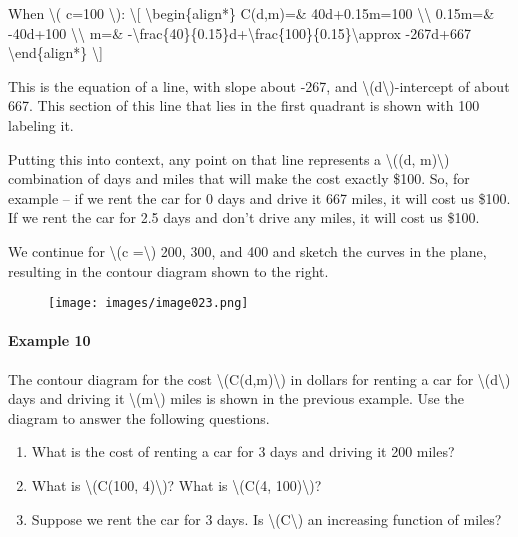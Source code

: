 When \textbackslash{}( c=100 \textbackslash{}): \textbackslash{}{[}
\textbackslash{}begin\{align*\} C(d,m)=\& 40d+0.15m=100
\textbackslash{}\textbackslash{} 0.15m=\& -40d+100
\textbackslash{}\textbackslash{} m=\&
-\textbackslash{}frac\{40\}\{0.15\}d+\textbackslash{}frac\{100\}\{0.15\}\textbackslash{}approx
-267d+667 \textbackslash{}end\{align*\} \textbackslash{}{]}

This is the equation of a line, with slope about -267, and
\textbackslash{}(d\textbackslash{})-intercept of about 667. This section
of this line that lies in the first quadrant is shown with 100 labeling
it.

Putting this into context, any point on that line represents a
\textbackslash{}((d, m)\textbackslash{}) combination of days and miles
that will make the cost exactly \$100. So, for example -- if we rent the
car for 0 days and drive it 667 miles, it will cost us \$100. If we rent
the car for 2.5 days and don't drive any miles, it will cost us \$100.

We continue for \textbackslash{}(c =\textbackslash{}) 200, 300, and 400
and sketch the curves in the plane, resulting in the contour diagram
shown to the right.

\begin{figure}
\centering
\texttt{[image: images/image023.png]}
\caption{}
\end{figure}

\hypertarget{example-10}{%
\paragraph{Example 10}\label{example-10}}

The contour diagram for the cost
\textbackslash{}(C(d,m)\textbackslash{}) in dollars for renting a car
for \textbackslash{}(d\textbackslash{}) days and driving it
\textbackslash{}(m\textbackslash{}) miles is shown in the previous
example. Use the diagram to answer the following questions.

\begin{enumerate}
\tightlist
\item
  What is the cost of renting a car for 3 days and driving it 200 miles?
\item
  What is \textbackslash{}(C(100, 4)\textbackslash{})? What is
  \textbackslash{}(C(4, 100)\textbackslash{})?
\item
  Suppose we rent the car for 3 days. Is
  \textbackslash{}(C\textbackslash{}) an increasing function of miles?
\end{enumerate}

